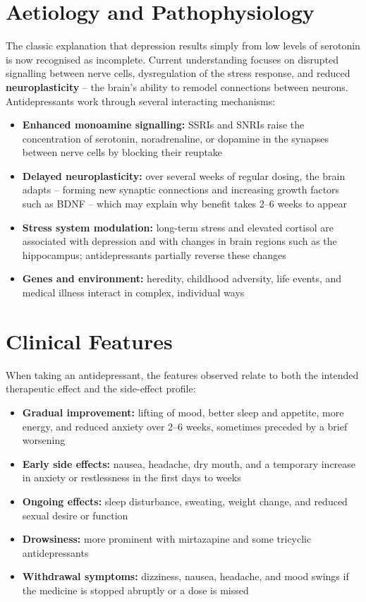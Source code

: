 \section*{Aetiology and Pathophysiology}
The classic explanation that depression results simply from low levels of serotonin is now recognised as incomplete. Current understanding focuses on disrupted signalling between nerve cells, dysregulation of the stress response, and reduced \textbf{neuroplasticity} -- the brain's ability to remodel connections between neurons. Antidepressants work through several interacting mechanisms:

\begin{itemize}
    \item \textbf{Enhanced monoamine signalling:} SSRIs and SNRIs raise the concentration of serotonin, noradrenaline, or dopamine in the synapses between nerve cells by blocking their reuptake
    \item \textbf{Delayed neuroplasticity:} over several weeks of regular dosing, the brain adapts -- forming new synaptic connections and increasing growth factors such as BDNF -- which may explain why benefit takes 2--6 weeks to appear
    \item \textbf{Stress system modulation:} long-term stress and elevated cortisol are associated with depression and with changes in brain regions such as the hippocampus; antidepressants partially reverse these changes
    \item \textbf{Genes and environment:} heredity, childhood adversity, life events, and medical illness interact in complex, individual ways
\end{itemize}

\section*{Clinical Features}
When taking an antidepressant, the features observed relate to both the intended therapeutic effect and the side-effect profile:

\begin{itemize}
    \item \textbf{Gradual improvement:} lifting of mood, better sleep and appetite, more energy, and reduced anxiety over 2--6 weeks, sometimes preceded by a brief worsening
    \item \textbf{Early side effects:} nausea, headache, dry mouth, and a temporary increase in anxiety or restlessness in the first days to weeks
    \item \textbf{Ongoing effects:} sleep disturbance, sweating, weight change, and reduced sexual desire or function
    \item \textbf{Drowsiness:} more prominent with mirtazapine and some tricyclic antidepressants
    \item \textbf{Withdrawal symptoms:} dizziness, nausea, headache, and mood swings if the medicine is stopped abruptly or a dose is missed
\end{itemize}

